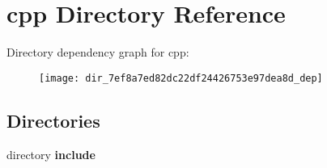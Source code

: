 \section{cpp Directory Reference}
\label{dir_7ef8a7ed82dc22df24426753e97dea8d}
Directory dependency graph for cpp\-:\nopagebreak
\begin{figure}[H]
\begin{center}
\leavevmode
\texttt{[image: dir\_7ef8a7ed82dc22df24426753e97dea8d\_dep]}
\end{center}
\end{figure}
\subsection*{Directories}
\begin{DoxyCompactItemize}
\item 
directory {\bf include}
\end{DoxyCompactItemize}
